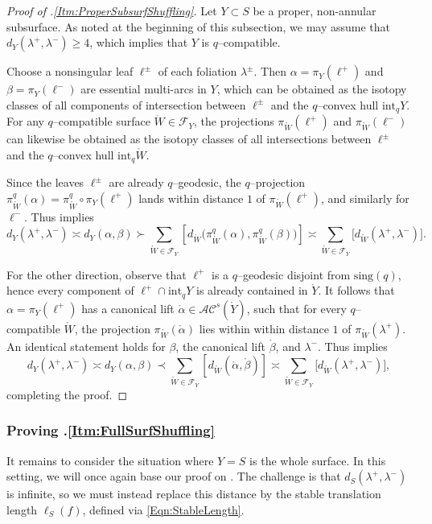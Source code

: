 \documentclass[11pt,letterpaper]{amsart}
\newcommand{\sing}{\mathrm{sing}}
\newcommand{\mc}{\mathcal}
\newcommand{\mr}{\mathring}
\newcommand{\psub}{\mr W}
\numberwithin{equation}{section}
\theoremstyle{definition}
\newcommand{\AC}{\mathcal{AC}}
\renewcommand{\int}{\mathrm{int}}
\begin{document}
\begin{proof}[Proof of .\eqref{Itm:ProperSubsurfShuffling}]
Let $Y \subset S$ be a proper, non-annular subsurface. As noted at the beginning of this subsection, we may assume that $d_Y(\lambda^+, \lambda^-) \geq 4$, which implies that $Y$ is $q$--compatible.

Choose a nonsingular leaf $\ell^\pm$ of each foliation $\lambda^\pm$. Then $\alpha = \pi_Y(\ell^+)$ and $\beta = \pi_Y(\ell^-)$ are essential multi-arcs in $Y$, which can be obtained as the isotopy classes of all components of intersection between $\ell^\pm$ and the $q$--convex hull $\int_q Y$.
%
For any $q$--compatible surface $\psub \in \mc F_Y$, the projections $\pi_{\psub}(\ell^+)$ and $\pi_{\psub}(\ell^-)$ can likewise be obtained as the isotopy classes of all intersections between $\ell^\pm$ and the $q$--convex hull $\int_q \psub$.

Since the leaves $\ell^\pm$ are already $q$--geodesic, the $q$--projection $\pi_{\psub}^q (\alpha) = \pi_{\psub}^q \circ \pi_Y(\ell^+)$ lands within distance $1$ of $\pi_{\psub}(\ell^+)$, and similarly for $\ell^-$. Thus  implies
\[
d_Y(\lambda^+, \lambda^-) \asymp
d_Y(\alpha, \beta)  \succ
 \sum_{\psub \in \mc F_Y} \left[ d_{\psub} \Big( \pi^{q}_{\psub} (\alpha), \pi^{q}_{\psub}(\beta) \Big) \right] \asymp
\sum_{\psub \in \mc F_Y} \big[ d_{\psub}(\lambda^+, \lambda^-) \big].
\]

For the other direction, observe that $\ell^+$ is a $q$--geodesic disjoint from $\sing(q)$, hence every component of $\ell^+ \cap \int_q Y$ is already contained in $\mr Y$. It follows that $\alpha = \pi_Y(\ell^+)$ has a canonical lift $\mr \alpha \in \AC^s(\mr Y)$, such that for every $q$--compatible $\psub$, the projection $\pi_{\psub}(\mr \alpha)$ lies within within distance $1$ of $\pi_{\psub}(\lambda^+)$. An identical statement holds for $\beta$, the canonical lift $\mr \beta$, and $\lambda^-$. Thus  implies
\[
d_Y(\lambda^+, \lambda^-) \asymp d_Y(\alpha, \beta) \prec \sum_{\psub \in \mc F_Y} \left[ d_{\psub} (\mr \alpha,  \mr \beta ) \right]
\asymp \sum_{\psub \in \mc F_Y} \big[ d_{\psub}(\lambda^+, \lambda^-) \big],
\]
completing the proof.
\end{proof}




\subsubsection{Proving .\eqref{Itm:FullSurfShuffling}}
It remains to consider the situation where $Y = S$ is the whole surface. In this setting, we will once again base our proof on . The challenge is that $d_S(\lambda^+, \lambda^-)$ is infinite, so we must instead replace this distance by the stable translation length $\ell_S(f)$, defined via \eqref{Eqn:StableLength}.
\end{document}
